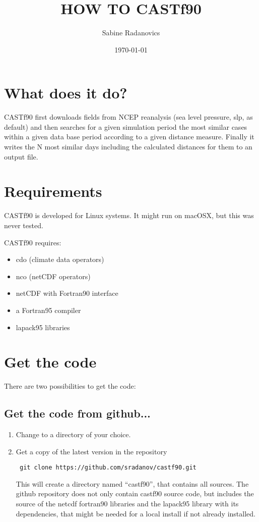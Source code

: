 \documentclass[11p,a4paper]{article}
\title{HOW TO CASTf90}
\author{Sabine Radanovics}
\date{\today}
\begin{document}
\maketitle
\tableofcontents
\section{What does it do?}
CASTf90 first downloads fields from NCEP reanalysis (sea level pressure, slp, as default) and then searches for a given simulation period the most similar cases within a given data base period according to a given distance measure. Finally it writes the N most similar days including the calculated distances for them to an output file. 
\section{Requirements}
CASTf90 is developed for Linux systems. It might run on macOSX, but this was never tested. 

CASTf90 requires:
\begin{itemize}
 \item cdo (climate data operators)
 \item nco (netCDF operators)
 \item netCDF with Fortran90 interface
 \item a Fortran95 compiler
 \item lapack95 libraries
\end{itemize}

\section{Get the code}
There are two possibilities to get the code:
\subsection{Get the code from github...}
\begin{enumerate}
\item Change to a directory of your choice.
\item Get a copy of the latest version in the repository
\begin{verbatim}
 git clone https://github.com/sradanov/castf90.git
\end{verbatim}
This will create a directory named ``castf90'', that contains all sources. The github repository does not only contain castf90 source code, but includes the source of the netcdf fortran90 libraries and the lapack95 library with its dependencies, that might be needed for a local install if not already installed. 
\end{enumerate}
\end{document}
